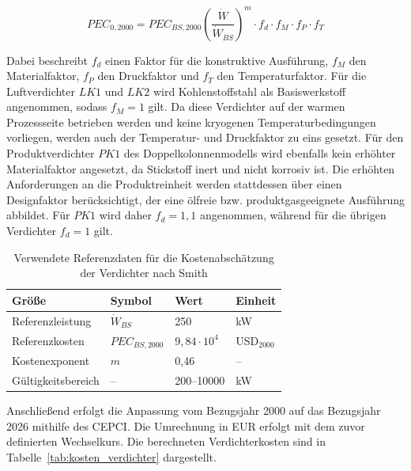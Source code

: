 \begin{equation}
PEC_{0,2000} =
PEC_{BS,2000}
\left( \frac{\dot W}{\dot W_{BS}} \right)^m
\cdot f_d \cdot f_M \cdot f_P \cdot f_T
\end{equation}

Dabei beschreibt $f_d$ einen Faktor für die konstruktive Ausführung, $f_M$ den Materialfaktor, $f_P$ den Druckfaktor und $f_T$ den Temperaturfaktor. Für die Luftverdichter $LK1$ und $LK2$ wird Kohlenstoffstahl als Basiswerkstoff angenommen, sodass $f_M=1$ gilt. Da diese Verdichter auf der warmen Prozessseite betrieben werden und keine kryogenen Temperaturbedingungen vorliegen, werden auch der Temperatur- und Druckfaktor zu eins gesetzt. Für den Produktverdichter $PK1$ des Doppelkolonnenmodells wird ebenfalls kein erhöhter Materialfaktor angesetzt, da Stickstoff inert und nicht korrosiv ist. Die erhöhten Anforderungen an die Produktreinheit werden stattdessen über einen Designfaktor berücksichtigt, der eine ölfreie bzw. produktgasgeeignete Ausführung abbildet. Für $PK1$ wird daher $f_d=1{,}1$ angenommen, während für die übrigen Verdichter $f_d=1$ gilt.

\begin{table}[H]
\centering
\caption{Verwendete Referenzdaten für die Kostenabschätzung der Verdichter nach Smith \cite{smithChemicalProcessDesign}}
\label{tab:referenzdaten_verdichter}
\begin{tabular}{llll}
\hline
Größe & Symbol & Wert & Einheit \\
\hline
Referenzleistung & $\dot W_{BS}$ & 250 & kW \\
Referenzkosten & $PEC_{BS,2000}$ & $9{,}84 \cdot 10^4$ & USD$_{2000}$ \\
Kostenexponent & $m$ & 0{,}46 & -- \\
Gültigkeitsbereich & -- & 200--10000 & kW \\
\hline
\end{tabular}
\end{table}

Anschließend erfolgt die Anpassung vom Bezugsjahr 2000 auf das Bezugsjahr 2026 mithilfe des CEPCI. Die Umrechnung in EUR erfolgt mit dem zuvor definierten Wechselkurs. Die berechneten Verdichterkosten sind in Tabelle~\ref{tab:kosten_verdichter} dargestellt.

